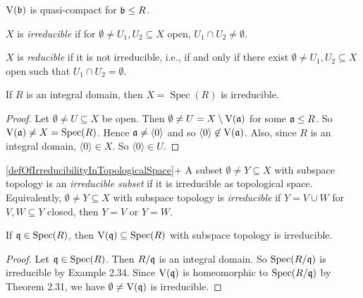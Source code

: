 \begin{corollary}
    $\operatorname{V}(\mathfrak{b})$ is quasi-compact for $\mathfrak{b} \leq R$.
\end{corollary}

\begin{definition}\label{defOfIrreducibilityInTopologicalSpace}
    $X$ is \emph{irreducible} if for $\emptyset \neq U_1,U_2 \subseteq X$ open, $U_1 \cap U_2 \neq \emptyset$. \par 
    $X$ is \emph{reducible} if it is not irreducible, i.e., if and only if there exist $\emptyset \neq U_1,U_2 \subseteq X$ open such that $U_1 \cap U_2 = \emptyset$.
\end{definition}

\begin{example}
    If $R$ is an integral domain, then $X = \operatorname{Spec}(R)$ is irreducible.
\end{example}

\begin{proof}
    Let $\emptyset \neq U \subseteq X$ be open. Then $\emptyset \neq U = X \setminus \operatorname{V}(\mathfrak{a})$ for some $\mathfrak{a} \leq R$. So $\operatorname{V}(\mathfrak{a}) \neq X = \operatorname{Spec}(R)$. Hence $\mathfrak{a} \neq \langle 0 \rangle$ and so $\langle 0 \rangle \not \in \operatorname{V}(\mathfrak{a})$. Also, since $R$ is an integral domain, $\langle 0 \rangle \in X$. So $\langle 0 \rangle \in U$. 
\end{proof}

\begin{customdefinition}{\ref{defOfIrreducibilityInTopologicalSpace}+}
    A subset $\emptyset \neq Y \subseteq X$ with subspace topology is an \emph{irreducible subset} if it is irreducible as topological space. Equivalently, $\emptyset \neq Y \subseteq X$ with subspace topology is \emph{irreducible} if $Y = V \cup W$ for $V,W \subseteq Y$ closed, then $Y = V$ or $Y = W$.
\end{customdefinition}

\begin{corollary}
    If $\mathfrak{q} \in \operatorname{Spec}(R)$, then $\operatorname{V}(\mathfrak{q}) \subseteq \operatorname{Spec}(R)$ with subspace topology is irreducible.
\end{corollary}

\begin{proof}
    Let $\mathfrak{q} \in \operatorname{Spec}(R)$. Then $R/\mathfrak{q}$ is an integral domain. So $\operatorname{Spec}(R/\mathfrak{q})$ is irreducible by Example 2.34. Since $\operatorname{V}(\mathfrak{q})$ is homeomorphic to $\operatorname{Spec}(R/\mathfrak{q})$ by Theorem 2.31, we have $\emptyset \neq \operatorname{V}(\mathfrak{q})$ is irreducible.
\end{proof}

